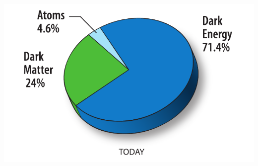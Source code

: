 \documentclass{beamer}
\begin{document}
\begin{frame}
\begin{minipage}[b]{\linewidth}
\begin{columns}
\begin{column}{0.35\linewidth}
\begin{itemize}
      \end{itemize}
    \mbox{
    \includegraphics[height=0.5\textwidth,width=0.30\paperwidth]      {THESISPLOTS/WMAPUniversePie.pdf}}
    \end{column}
\end{columns}
\end{minipage}
\end{frame}
\end{document}
